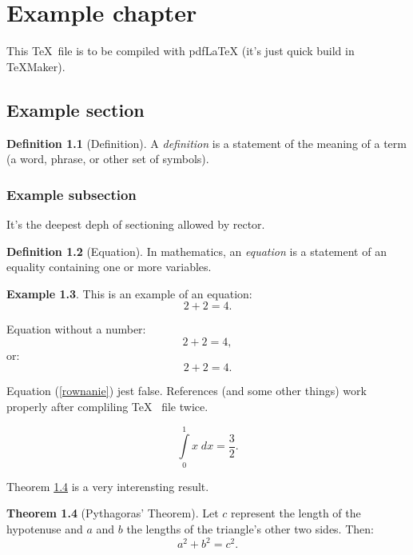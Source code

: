 \documentclass[a4paper,11pt,twoside]{report}
\theoremstyle{definition}
\newtheorem{theorem}{Theorem}[chapter]
\newtheorem{example}[theorem]{Example}
\newtheorem{definition}[theorem]{Definition}
\begin{document}
\chapter{Example chapter}

This \TeX~file is to be compiled with pdfLaTeX (it's just quick build in TeXMaker).


\section{Example section}

\begin{definition}[Definition]
A \emph{definition} is a statement of the meaning of a term (a word, phrase, or other set of symbols).
\end{definition}

\subsection{Example subsection}

It's the deepest deph of sectioning allowed by rector.

\begin{definition}[Equation]
In mathematics, an \emph{equation} is a statement of an equality containing one or more variables.
\end{definition}

\begin{example}
This is an example of an equation:
\begin{equation}
2+2=4.
\end{equation}

Equation without a number:
\begin{equation*}
2+2=4,
\end{equation*}
or:
\[
2+2=4.
\]

Equation (\ref{rownanie}) jest false. References (and some other things) work properly after compliling \TeX ~ file twice.

\begin{equation}\label{rownanie}
\int \limits_{0}^{1} x \; dx = \frac{3}{2}.
\end{equation}

\end{example}

Theorem \ref{Pitagoras} is a very interensting result.

\begin{theorem}[Pythagoras' Theorem]\label{Pitagoras}
Let $c$ represent the length of the hypotenuse and $a$ and $b$ the lengths of the triangle's other two sides. Then:
$$
a^2 + b^2 = c^2.
$$
\end{theorem}
\end{document}
